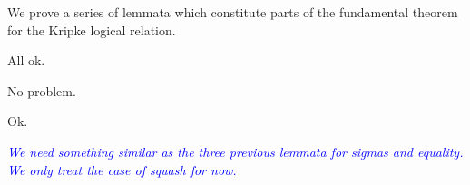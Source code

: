 \documentclass[a4paper,english]{lipics-utf8x}
\newcommand\meta[1]{\noindent\textcolor{blue}{\emph{#1}}}
\begin{document}
  We prove a series of lemmata which constitute parts of the fundamental theorem
  for the Kripke logical relation.

  \begin{lemma}
    \leavevmode
    \begin{mathc}
    \end{mathc}
  \end{lemma}
  All ok.

  \begin{lemma}
    \leavevmode
    \begin{mathc}
    \end{mathc}
  \end{lemma}
  No problem.

  \begin{lemma}
    \leavevmode
    \begin{mathc}
    \end{mathc}
  \end{lemma}
  Ok.

  \meta{We need something similar as the three previous lemmata for sigmas and
  equality. We only treat the case of squash for now.}

  \begin{lemma}
    \leavevmode
    \begin{mathc}
    \end{mathc}
  \end{lemma}
\end{document}
